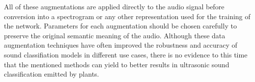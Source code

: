 All of these augmentations are applied directly to the audio signal before conversion into a spectrogram or any other representation used for the training of the network. Parameters for each augmentation should be chosen carefully to preserve the original semantic meaning of the audio. Although these data augmentation techniques have often improved the robustness and accuracy of sound classifiation models in different use cases, there is no evidence to this time that the mentioned methods can yield to better results in ultrasonic sound classification emitted by plants.